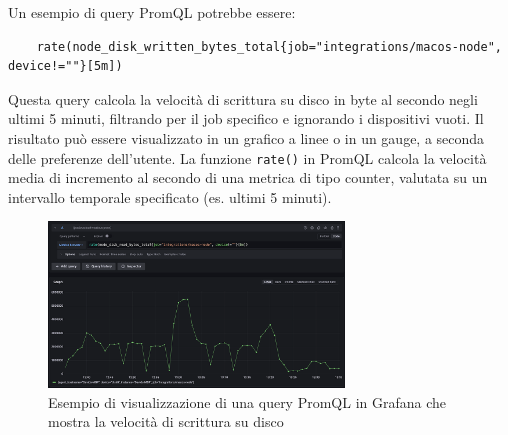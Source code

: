 Un esempio di query PromQL potrebbe essere:
\begin{verbatim}
    rate(node_disk_written_bytes_total{job="integrations/macos-node", device!=""}[5m])
\end{verbatim}

Questa query calcola la velocità di scrittura su disco in byte al secondo negli ultimi 5 minuti, filtrando per il job specifico e ignorando i dispositivi vuoti. Il risultato può essere visualizzato in un grafico a linee o in un gauge, a seconda delle preferenze dell'utente.
La funzione \texttt{rate()} in PromQL calcola la velocità media di incremento al secondo di una metrica di tipo counter, valutata su un intervallo temporale specificato (es. ultimi 5 minuti).

\begin{figure}[h]
    \centering
    \includegraphics[width=0.7\textwidth]{img/rate-function.png}
    \caption{Esempio di visualizzazione di una query PromQL in Grafana che mostra la velocità di scrittura su disco}
    \label{fig:rate_function_example}
\end{figure}


\newpage